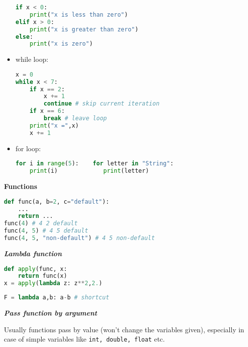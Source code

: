 \documentclass[fontsize=8pt, a4paper, landscape, fleqn]{scrartcl}
\renewcommand{\subsection}[1]{%
    \noindent\colorbox{subsectioncolor}{%
        \parbox{\dimexpr\columnwidth-2\fboxsep}{\color{white}\textbf{#1}}}%
    \vspace{0.5mm}%
}
\renewcommand{\subsubsection}[1]{%
    \noindent\textbf{\textit{\color{subsectioncolor}#1}}%
    \vspace{1mm}%
}
\begin{document}
\begin{multicols*}{3}[\raggedcolumns]
\begin{itemize}
    \begin{lstlisting}[language=python, breaklines]
if x < 0:
    print("x is less than zero")
elif x > 0:
    print("x is greater than zero")
else:
    print("x is zero") \end{lstlisting}
    \item while loop:
    \begin{lstlisting}[language=python, breaklines]
x = 0
while x < 7:
    if x == 2:
        x += 1
        continue # skip current iteration
    if x == 6:
        break # leave loop
    print("x =",x)
    x += 1 \end{lstlisting}
    \item for loop:    
    \begin{lstlisting}[language=python, breaklines]
for i in range(5):    for letter in "String":
    print(i)             print(letter) \end{lstlisting}
    \end{itemize}
	
    \subsection{Functions}
    \begin{lstlisting}[language=python, breaklines]
def func(a, b=2, c="default"):
    ...
    return ...
func(4) # 4 2 default
func(4, 5) # 4 5 default
func(4, 5, "non-default") # 4 5 non-default\end{lstlisting}

    \subsubsection{Lambda function}
    \begin{lstlisting}[language=python, breaklines, emph={lambda}, emphstyle={\color{red}}]
def apply(func, x:
    return func(x)
x = apply(lambda z: z**2,2.)\end{lstlisting}
    \begin{lstlisting}[language=python, breaklines, emph={lambda}, emphstyle={\color{red}}]
F = lambda a,b: a-b # shortcut \end{lstlisting}
    
    \subsubsection{Pass function by argument}
    Usually functions pass by value (won't change the variables given), especially in case of simple variables like \lstinline{int, double, float} etc.

\end{multicols*}
\end{document}
